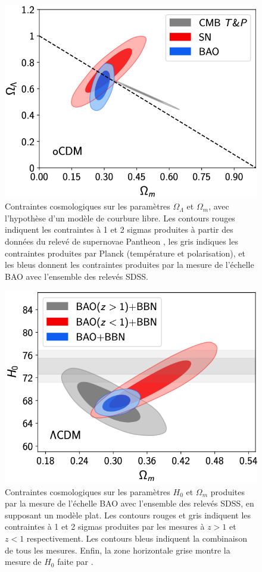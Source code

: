 \begin{figure}
  \centering
  \includegraphics[scale=0.45]{olambda_om}
  \caption{Contraintes cosmologiques sur les paramètres $\Omega_{\Lambda}$ et $\Omega_{m}$, avec l'hypothèse d'un modèle \lcdm{} de courbure libre. Les contours rouges indiquent les contraintes à 1 et 2 sigmas produites à partir des données du relevé de supernovae Pantheon \autocite{Scolnic2017}, les gris indiques les contraintes produites par Planck (température et polarisation), et les bleus donnent les contraintes produites par la mesure de l'échelle BAO avec l'ensemble des relevés SDSS.}
  \label{fig:olambda_om}
\end{figure}

\begin{figure}
  \centering
  \includegraphics[scale=0.45]{hzero_om}
  \caption{Contraintes cosmologiques sur les paramètres $H_0$ et $\Omega_{m}$ produites par la mesure de l'échelle BAO avec l'ensemble des relevés SDSS, en supposant un modèle \lcdm{} plat. Les contours rouges et gris indiquent les contraintes à 1 et 2 sigmas produites par les mesures à $z > 1$ et $z < 1$ respectivement. Les contours bleus indiquent la combinaison de tous les mesures. Enfin, la zone horizontale grise montre la mesure de $H_0$ faite par \textcite{Riess2019}.}
  \label{fig:h0_om}
\end{figure}


